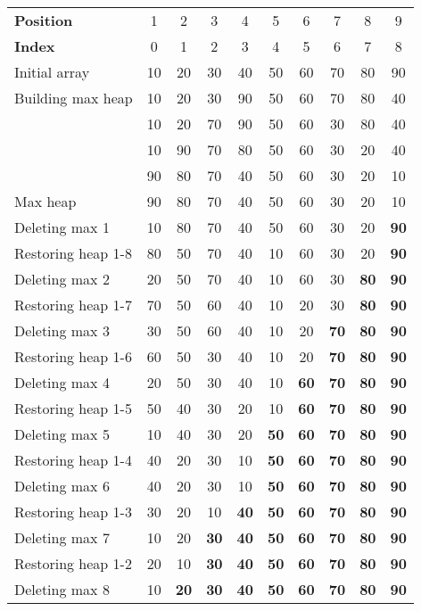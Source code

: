 \documentclass{article}
\begin{document}
\begin{tabular}{|l|c|c|c|c|c|c|c|c|c|}
\hline
\textbf{Position}& 1& 2& 3& 4& 5& 6& 7& 8& 9 \\
\textbf{Index}& 0& 1& 2& 3& 4& 5& 6& 7& 8 \\
\hline
Initial array& 10& 20& 30& 40& 50& 60& 70& 80& 90 \\
\hline
Building max heap& 10& 20& 30& 90& 50& 60& 70& 80& 40 \\
& 10& 20& 70& 90& 50& 60& 30& 80& 40 \\
& 10& 90& 70& 80& 50& 60& 30& 20& 40 \\
& 90& 80& 70& 40& 50& 60& 30& 20& 10 \\
\hline
Max heap& 90& 80& 70& 40& 50& 60& 30& 20& 10 \\
\hline
Deleting max 1& 10& 80& 70& 40& 50& 60& 30& 20& \textbf{90} \\
Restoring heap 1-8& 80& 50& 70& 40& 10& 60& 30& 20& \textbf{90} \\
\hline
Deleting max 2& 20& 50& 70& 40& 10& 60& 30& \textbf{80}& \textbf{90} \\
Restoring heap 1-7& 70& 50& 60& 40& 10& 20& 30& \textbf{80}& \textbf{90} \\
\hline
Deleting max 3& 30& 50& 60& 40& 10& 20& \textbf{70}& \textbf{80}& \textbf{90} \\
Restoring heap 1-6& 60& 50& 30& 40& 10& 20& \textbf{70}& \textbf{80}& \textbf{90} \\
\hline
Deleting max 4& 20& 50& 30& 40& 10& \textbf{60}& \textbf{70}& \textbf{80}& \textbf{90} \\
Restoring heap 1-5& 50& 40& 30& 20& 10& \textbf{60}& \textbf{70}& \textbf{80}& \textbf{90} \\
\hline
Deleting max 5& 10& 40& 30& 20& \textbf{50}& \textbf{60}& \textbf{70}& \textbf{80}& \textbf{90} \\
Restoring heap 1-4& 40& 20& 30& 10& \textbf{50}& \textbf{60}& \textbf{70}& \textbf{80}& \textbf{90} \\
\hline
Deleting max 6& 40& 20& 30& 10& \textbf{50}& \textbf{60}& \textbf{70}& \textbf{80}& \textbf{90} \\
Restoring heap 1-3& 30& 20& 10& \textbf{40}& \textbf{50}& \textbf{60}& \textbf{70}& \textbf{80}& \textbf{90} \\
\hline
Deleting max 7& 10& 20& \textbf{30}& \textbf{40}& \textbf{50}& \textbf{60}& \textbf{70}& \textbf{80}& \textbf{90} \\
Restoring heap 1-2& 20& 10& \textbf{30}& \textbf{40}& \textbf{50}& \textbf{60}& \textbf{70}& \textbf{80}& \textbf{90} \\
\hline
Deleting max 8& 10& \textbf{20}& \textbf{30}& \textbf{40}& \textbf{50}& \textbf{60}& \textbf{70}& \textbf{80}& \textbf{90} \\
\hline
\end{tabular}
\end{document}
